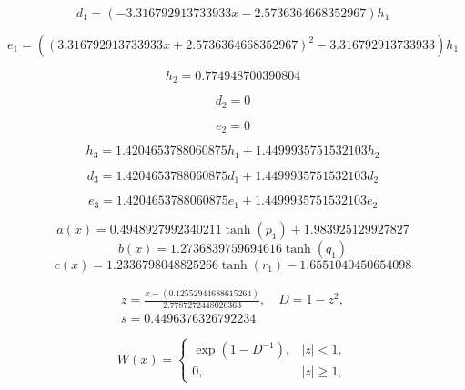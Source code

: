 \begin{equation}
d_{1}=\left(- 3.316792913733933 x - 2.5736364668352967\right) h_{1}
\end{equation}


\begin{equation}
e_{1}=\left(\left(3.316792913733933 x + 2.5736364668352967\right)^{2} - 3.316792913733933\right) h_{1}
\end{equation}


\begin{equation}
h_{2}=0.774948700390804
\end{equation}


\begin{equation}
d_{2}=0
\end{equation}


\begin{equation}
e_{2}=0
\end{equation}


\begin{equation}
h_{3}=1.4204653788060875 h_{1} + 1.4499935751532103 h_{2}
\end{equation}


\begin{equation}
d_{3}=1.4204653788060875 d_{1} + 1.4499935751532103 d_{2}
\end{equation}


\begin{equation}
e_{3}=1.4204653788060875 e_{1} + 1.4499935751532103 e_{2}
\end{equation}


\begin{equation}
a(x)=0.4948927992340211 \tanh{\left(p_{1} \right)} + 1.983925129927827
\end{equation}
\begin{equation}
b(x)=1.2736839759694616 \tanh{\left(q_{1} \right)}
\end{equation}
\begin{equation}
c(x)=1.2336798048825266 \tanh{\left(r_{1} \right)} - 1.6551040450654098
\end{equation}


\begin{equation}
\begin{aligned}z=\frac{x-(0.12552944688615264)}{2.7787272448026363},\quad D=1-z^2,\\s=0.4496376326792234\end{aligned}
\end{equation}


\begin{equation}
W(x)=\begin{cases}\exp(1-D^{-1}),&|z|<1,\\0,&|z|\ge1,\end{cases}
\end{equation}


